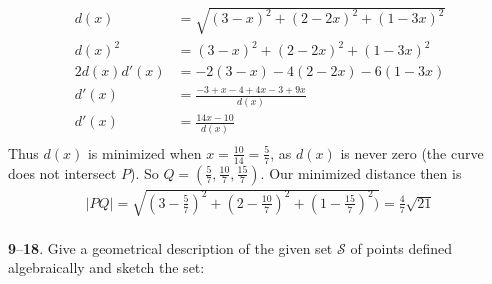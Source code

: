 \documentclass[12pt]{amsbook}
\let\cal\mathcal
\begin{document}
\begin{align*}
d(x)&=\sqrt{(3-x)^2+(2-2x)^2+(1-3x)^2}\\
d(x)^2&=(3-x)^2+(2-2x)^2+(1-3x)^2\\
2d(x)d'(x)&=-2(3-x)-4(2-2x)-6(1-3x)\\
d'(x)&=\frac{-3+x-4+4x-3+9x}{d(x)}\\
d'(x)&=\frac{14x-10}{d(x)}\\
\end{align*}
Thus $d(x)$ is minimized when $x=\frac{10}{14}=\frac{5}{7}$, as $d(x)$ is never zero (the curve does not intersect $P$). So $Q=(\frac{5}{7},\frac{10}{7},\frac{15}{7})$. Our minimized distance then is
\begin{align*}
|PQ|=\sqrt{(3-\frac{5}{7})^2+(2-\frac{10}{7})^2+(1-\frac{15}{7})^2)}=\frac{4}{7}\sqrt{21}
\end{align*}
\\
{\small {\bf 9}--{\bf 18}}. Give a geometrical description of the given set
${\cal S}$
of points
defined algebraically and sketch the set:
\end{document}
